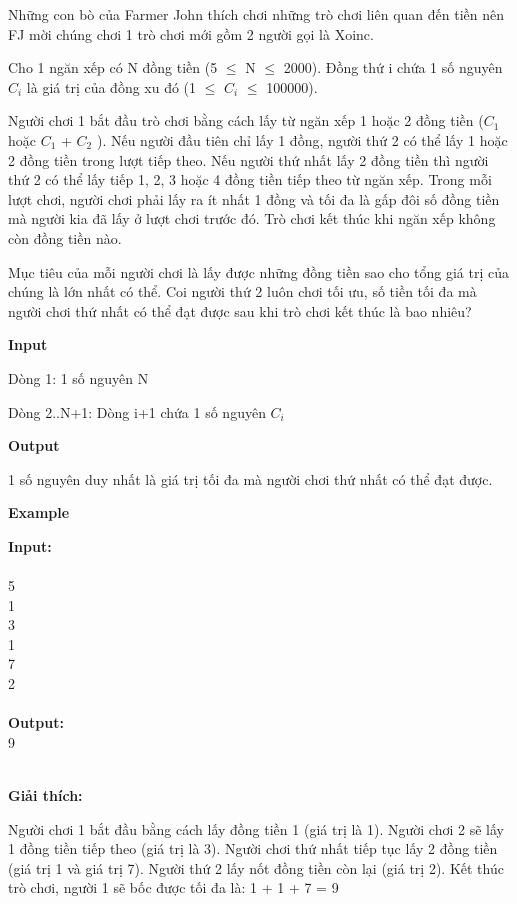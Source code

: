 















   Những con bò của Farmer John thích chơi những trò chơi liên quan đến tiền nên FJ mời chúng chơi 1 trò chơi mới gồm 2 người gọi là Xoinc.  

   Cho 1 ngăn xếp có N đồng tiền (5  $\le$  N  $\le$  2000). Đồng thứ i chứa 1 số nguyên $C_{i}$   là giá trị của đồng xu đó (1  $\le$  $C_{i}$    $\le$  100000).  

   Người chơi 1 bắt đầu trò chơi bằng cách lấy từ ngăn xếp 1 hoặc 2 đồng tiền ($C_{1}$   hoặc $C_{1}$   + $C_{2}$   ). Nếu người đầu tiên chỉ lấy 1 đồng, người thứ 2 có thể lấy 1 hoặc 2 đồng tiền trong lượt tiếp theo. Nếu người thứ nhất lấy 2 đồng tiền thì người thứ 2 có thể lấy tiếp 1, 2, 3 hoặc 4 đồng tiền tiếp theo từ ngăn xếp. Trong mỗi lượt chơi, người chơi phải lấy ra ít nhất 1 đồng và tối đa là gấp đôi số đồng tiền mà người kia đã lấy ở lượt chơi trước đó. Trò chơi kết thúc khi ngăn xếp không còn đồng tiền nào.  

   Mục tiêu của mỗi người chơi là lấy được những đồng tiền sao cho tổng giá trị của chúng là lớn nhất có thể. Coi người thứ 2 luôn chơi tối ưu, số tiền tối đa mà người chơi thứ nhất có thể đạt được sau khi trò chơi kết thúc là bao nhiêu?  



\textbf{    Input   }

   Dòng 1: 1 số nguyên N  

   Dòng 2..N+1: Dòng i+1 chứa 1 số nguyên $C_{i}$

\textbf{    Output   }

   1 số nguyên duy nhất là giá trị tối đa mà người chơi thứ nhất có thể đạt được.  

\textbf{    Example   }

\textbf{    Input:   }
\\
\\   5   
\\   1   
\\   3   
\\   1   
\\   7   
\\   2   
\\
\\\textbf{    Output:   }
\\   9   
\\
\\\textbf{}

\textbf{     Giải thích:    }

   Người chơi 1 bắt đầu bằng cách lấy đồng tiền 1 (giá trị là 1). Người chơi 2 sẽ lấy 1 đồng tiền tiếp theo (giá trị là 3). Người chơi thứ nhất tiếp tục lấy 2 đồng tiền (giá trị 1 và giá trị 7). Người thứ 2 lấy nốt đồng tiền còn lại (giá trị 2). Kết thúc trò chơi, người 1 sẽ bốc được tối đa là: 1 + 1 + 7 = 9  


